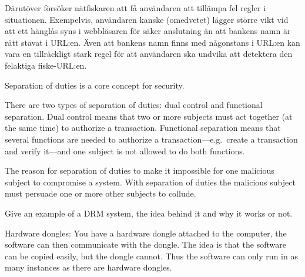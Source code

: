 \documentclass[svv,addpoints]{miunexam}
\begin{document}
\begin{questions}
\begin{parts}
\begin{solution}
      Därutöver försöker nätfiskaren att få användaren att tillämpa fel regler 
      i situationen.
      Exempelvis, användaren kanske (omedvetet) lägger större vikt vid att ett 
      hänglås syns i webbläsaren för säker anslutning än att bankens namn är 
      rätt stavat i URL:en.
      Även att bankens namn finns med någonstans i URL:en kan vara en 
      tillräckligt stark regel för att användaren ska undvika att detektera den 
      felaktiga fiske-URL:en.
    \end{solution}
  \end{parts}


  
\question\label{q:accountability:E:C}
  Separation of duties is a core concept for security.

  \begin{solution}
    There are two types of separation of duties:
    dual control and functional separation.
    Dual control means that two or more subjects must act together (at the same 
    time) to authorize a transaction.
    Functional separation means that several functions are needed to authorize 
    a transaction---e.g.~create a transaction and verify it---and one subject 
    is not allowed to do both functions.

    The reason for separation of duties to make it impossible for one malicious 
    subject to compromise a system.
    With separation of duties the malicious subject must persuade one or more 
    other subjects to collude.
  \end{solution}


  
\question[4]\label{q:trustcomp}
Give an example of a DRM system, the idea behind it and why it works or not.

\begin{solution}
  Hardware dongles:
  You have a hardware dongle attached to the computer, the software can then 
  communicate with the dongle.
  The idea is that the software can be copied easily, but the dongle cannot.
  Thus the software can only run in as many instances as there are hardware 
  dongles.


\end{solution}
\end{questions}
\end{document}
